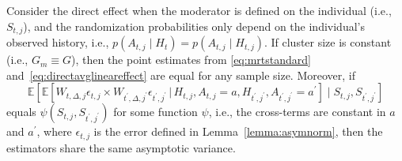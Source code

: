 \documentclass[lineno]{biometrika}
\def\E{\mathbb{E}}
\def\given{\, | \,}
\begin{document}
\begin{lemma}
\label{lemma:samesies}
Consider the direct effect when the moderator is defined on the individual (i.e., $S_{t,j}$), and the randomization probabilities only depend on the individual's observed history, i.e., $p(A_{t,j} \mid H_t) = p(A_{t,j} \mid H_{t,j})$.  If cluster size is constant (i.e., $G_m \equiv G$), then the point estimates from \eqref{eq:mrtstandard} and~\eqref{eq:directavglineareffect} are equal for any sample size. Moreover, if
\begin{equation}
    \label{eq:samesiescondition}
    \E \left[ \E \left[ W_{t,\Delta,j} \epsilon_{t,j} \times W_{t^\prime, \Delta, j^\prime} \epsilon_{t^\prime, j^\prime} \given H_{t,j}, A_{t,j}=a, H_{t^\prime,j^\prime}, A_{t^\prime,j^\prime} = a^\prime \right] \mid S_{t,j}, S_{t^\prime,j^\prime} \right]
\end{equation}
equals $\psi(S_{t,j}, S_{t^\prime,j^\prime})$
for some function $\psi$, i.e., the cross-terms are constant in $a$ and $a^\prime$, where $\epsilon_{t,j}$ is the error defined in Lemma~\ref{lemma:asymnorm}, then the estimators share the same asymptotic variance.
\end{lemma}
\end{document}
